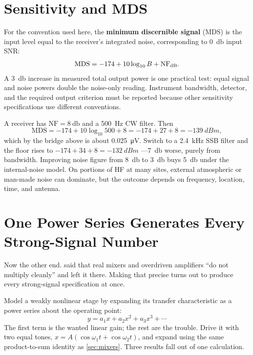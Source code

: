 \section{Sensitivity and MDS}
For the convention used here, the \textbf{minimum discernible signal} (MDS) is the
input level equal to the receiver's integrated noise, corresponding to
\SI{0}{\decibel} input SNR:
\[
\mathrm{MDS}=-174+10\log_{10}B+\mathrm{NF}_{\mathrm{dB}}.
\]
A \SI{3}{\decibel} increase in measured total output power is one practical test:
equal signal and noise powers double the noise-only reading. Instrument bandwidth,
detector, and the required output criterion must be reported because other sensitivity
specifications use different conventions.

\begin{workedbox}
A receiver has \(\mathrm{NF}=\SI{8}{\decibel}\) and a \SI{500}{\hertz} CW filter. Then
\[
\mathrm{MDS}=-174+10\log_{10}500+8
=-174+27+8=\SI{-139}{dBm},
\]
which by the bridge above is about \SI{0.025}{\micro\volt}. Switch to a
\SI{2.4}{\kilo\hertz} SSB filter and the floor rises to \(-174+34+8=\SI{-132}{dBm}\)
---\SI{7}{\decibel} worse, purely from bandwidth. Improving noise figure from
\SI{8}{\decibel} to \SI{3}{\decibel} buys \SI{5}{\decibel} under the internal-noise
model. On portions of HF at many sites, external atmospheric or man-made noise can
dominate, but the outcome depends on frequency, location, time, and antenna.
\end{workedbox}

\section{One Power Series Generates Every Strong-Signal Number}
\label{sec:powerseries}
Now the other end.  said that real mixers and overdriven amplifiers ``do
not multiply cleanly'' and left it there. Making that precise turns out to produce every
strong-signal specification at once.

Model a weakly nonlinear stage by expanding its transfer characteristic as a power
series about the operating point:
\[
y=a_1x+a_2x^2+a_3x^3+\cdots
\]
The first term is the wanted linear gain; the rest are the trouble. Drive it with two
equal tones, \(x=A(\cos\omega_1t+\cos\omega_2t)\), and expand using the same
product-to-sum identity as \cref{sec:mixers}. Three results fall out of one calculation.

